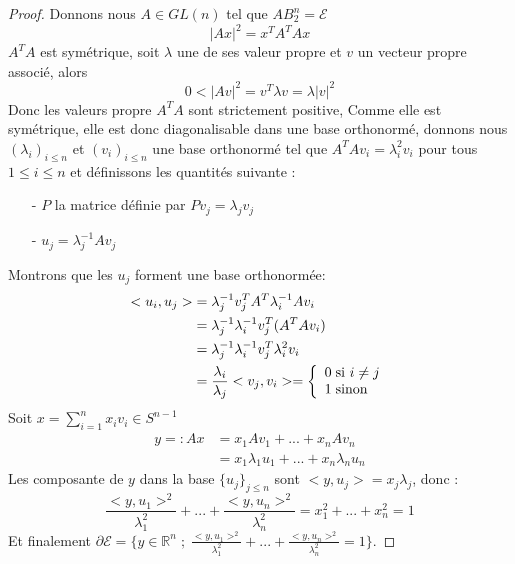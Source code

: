 \documentclass[12pt]{article}
\theoremstyle{definition}
\begin{document}
\begin{proof}
	Donnons nous $A\in GL(n)$ tel que $AB_2^n=\mathcal{E}$
	\begin{equation*}
	|Ax|^2 = x^T A^TAx 
	\end{equation*}
	$A^T A$ est symétrique, soit $\lambda$ une de ses valeur propre et $v$ un vecteur propre associé, alors  
	\begin{equation*}
	0< |Av|^2 = v^T \lambda v = \lambda |v|^2
	\end{equation*}
	Donc les valeurs propre $A^TA$ sont strictement positive, Comme elle est symétrique, elle est donc diagonalisable dans une base orthonormé, donnons nous $(\lambda_i)_{i\leq n}$ et $(v_i)_{i\leq n}$ une base orthonormé tel que $A^TAv_i = \lambda_i^2 v_i$ pour tous $1\leq i\leq n$ et définissons les quantités suivante :
	\begin{enumerate}
		\item[-] $P$ la matrice définie par $Pv_j = \lambda_j v_j$
		\item[-] $u_j=\lambda_j^{-1}Av_j$
	\end{enumerate}
	Montrons que les $u_j$ forment une base orthonormée: 
	\begin{align*}
	<u_i,u_j> &= \lambda_j^{-1}v_j^TA^T \lambda_i^{-1}Av_i\\
	&=\lambda_j^{-1}\lambda_i^{-1}v_j^T(A^T Av_i) \\
	&= \lambda_j^{-1}\lambda_i^{-1}v_j^T \lambda_i^2 v_i\\
	&=\frac{\lambda_i}{\lambda_j} <v_j,v_i> = \left\{ \begin{array}{ll} 0 \hspace{1mm}\text{si $i\neq j$} \\ 1 \hspace{1mm}\text{sinon} \end{array} \right.
	\end{align*}
	Soit $x = \sum_{i=1}^{n}x_i v_i\in S^{n-1}$  
	\begin{align*}
	y=: Ax&= x_1Av_1+...+x_nAv_n \\ 
	&= x_1 \lambda_1 u_1 + ... + x_n \lambda_n u_n
	\end{align*}
	Les composante de $y$ dans la base $\{u_j\}_{j\leq n}$ sont $<y,u_j> = x_j\lambda_j$, donc :
	\begin{equation*}
	\frac{<y,u_1>^2}{\lambda_1^2}+...+\frac{<y,u_n>^2}{\lambda_n^2} = x_1^2+...+x_n^2 =1
	\end{equation*}
	Et finalement $\partial \mathcal{E} = \big\{y\in\mathbb{R}^n \; ; \; \frac{<y,u_1>^2}{\lambda_1^2}+...+\frac{<y,u_n>^2}{\lambda_n^2} = 1\big\} $.
\end{proof}
\end{document}
